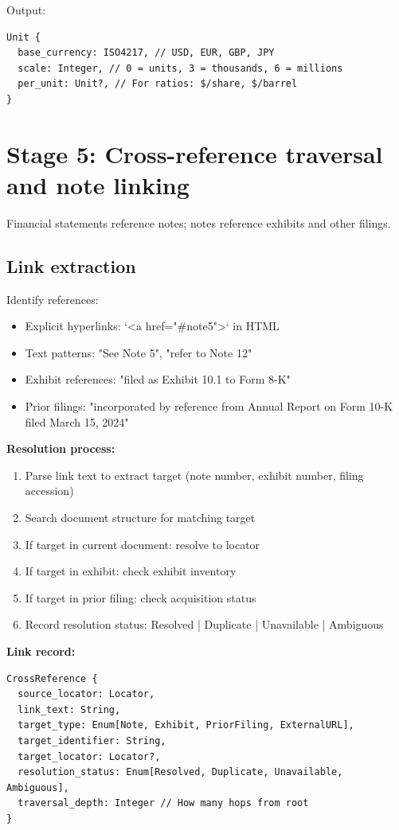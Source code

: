 Output:
\begin{lstlisting}
Unit {
  base_currency: ISO4217, // USD, EUR, GBP, JPY
  scale: Integer, // 0 = units, 3 = thousands, 6 = millions
  per_unit: Unit?, // For ratios: $/share, $/barrel
}
\end{lstlisting}

\section{Stage 5: Cross-reference traversal and note linking}

Financial statements reference notes; notes reference exhibits and other filings.

\subsection{Link extraction}

Identify references:
\begin{itemize}
\item Explicit hyperlinks: `<a href="#note5">` in HTML
\item Text patterns: "See Note 5", "refer to Note 12"
\item Exhibit references: "filed as Exhibit 10.1 to Form 8-K"
\item Prior filings: "incorporated by reference from Annual Report on Form 10-K
  filed March 15, 2024"
\end{itemize}

\textbf{Resolution process:}

\begin{enumerate}
\item Parse link text to extract target (note number, exhibit number, filing accession)
\item Search document structure for matching target
\item If target in current document: resolve to locator
\item If target in exhibit: check exhibit inventory
\item If target in prior filing: check acquisition status
\item Record resolution status: Resolved | Duplicate | Unavailable | Ambiguous
\end{enumerate}

\textbf{Link record:}

\begin{lstlisting}
CrossReference {
  source_locator: Locator,
  link_text: String,
  target_type: Enum[Note, Exhibit, PriorFiling, ExternalURL],
  target_identifier: String,
  target_locator: Locator?,
  resolution_status: Enum[Resolved, Duplicate, Unavailable, Ambiguous],
  traversal_depth: Integer // How many hops from root
}
\end{lstlisting}

